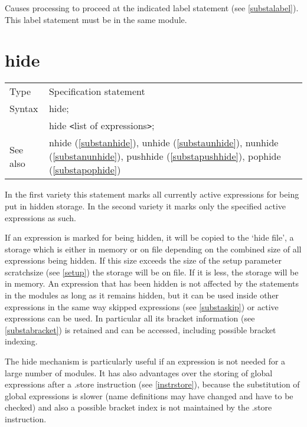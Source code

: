 \noindent Causes processing to proceed at the indicated 
label statement 
(see \ref{substalabel}). This label statement must be in the same module. 
\vspace{10mm}


\section{hide}
\label{substahide}

\noindent \begin{tabular}{ll}
Type & Specification statement\\
Syntax & hide; \\
       & hide {\tt<}list of expressions{\tt>};
\\ See also & nhide (\ref{substanhide}),
              unhide (\ref{substaunhide}),
              nunhide (\ref{substanunhide}),
              pushhide (\ref{substapushhide}),
              pophide (\ref{substapophide})
\end{tabular} \vspace{4mm}

\noindent In the first variety this statement marks all currently active 
expressions for being put in hidden storage. In the second variety it marks 
only the specified active expressions as such. \vspace{4mm}

\noindent If an expression is marked for being hidden, it will be copied to 
the `hide file', a storage which is 
either in memory or on file depending on the combined size of all 
expressions being hidden. If this size exceeds the size of the setup 
parameter scratchsize (see \ref{setup}) the storage will 
be on file. If it is less, the storage will be in memory. An expression 
that has been hidden is not affected by the statements in the modules as 
long as it remains hidden, but it can be used inside other expressions in 
the same way skipped expressions (see 
\ref{substaskip}) or active expressions can be used. In particular all its 
bracket information (see \ref{substabracket}) is retained 
and can be accessed, including possible bracket 
indexing. \vspace{4mm}

\noindent The hide mechanism is particularly useful if an expression is not 
needed for a large number of modules. It has also advantages over the 
storing of global expressions after a .store instruction (see 
\ref{instrstore}), because the substitution of global expressions is slower 
(name definitions may have changed and have to be checked) and also a 
possible bracket index is not maintained by the .store instruction. 
\vspace{4mm}

